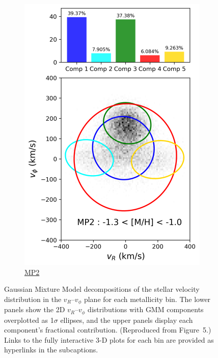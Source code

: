 \documentclass[a4paper,12pt]{article}
\begin{document}
\begin{figure}[h]
\begin{subfigure}[t]{0.24\textwidth}
        \includegraphics[width=\linewidth]{../figures/gmm_MP2.png}
        \caption{\href{https://raw.githack.com/raunaq-rai/Disentangling-the-Milky-Way-using-GMM/main/figures/MP2\_\_-1.3\%5BM\_H\%5D-1.0.html}{MP2}}
        \label{fig:gmm_mp2}
    \end{subfigure}
    
    \caption{
        Gaussian Mixture Model decompositions of the stellar velocity distribution in the $v_R$–$v_\phi$ plane for each metallicity bin. 
        The lower panels show the 2D $v_R$–$v_\phi$ distributions with GMM components overplotted as 1$\sigma$ ellipses, and the upper panels display each component’s fractional contribution. 
        (Reproduced from \citealt{zhang2024existencemetalpoordiscmilky} Figure~5.)  
        Links to the fully interactive 3-D plots for each bin are provided as hyperlinks in the subcaptions.
    }
    \label{fig:gmm_decompositions}
\end{figure}
\end{document}
